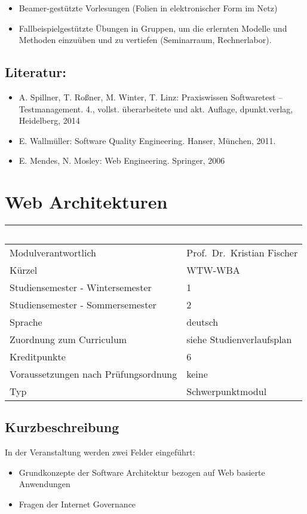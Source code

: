 \begin{itemize}
\item
  Beamer-gestützte Vorlesungen (Folien in elektronischer Form im Netz)
\item
  Fallbeispielgestützte Übungen in Gruppen, um die erlernten Modelle und
  Methoden einzuüben und zu vertiefen (Seminarraum, Rechnerlabor).
\end{itemize}

\section*{Literatur:}\label{literatur-24}

\begin{itemize}
\item
  A. Spillner, T. Roßner, M. Winter, T. Linz: Praxiswissen Softwaretest
  -- Testmanagement. 4., vollst. überarbeitete und akt. Auflage,
  dpunkt.verlag, Heidelberg, 2014
\item
  E. Wallmüller: Software Quality Engineering. Hanser, München, 2011.
\item
  E. Mendes, N. Mosley: Web Engineering. Springer, 2006
\end{itemize}

\chapter{Web Architekturen}\label{web-architekturen}

\begin{longtable}[]{@{}ll@{}}
\toprule
~ & ~\tabularnewline
\midrule
\endhead
Modulverantwortlich & Prof.~Dr.~Kristian Fischer\tabularnewline
Kürzel & WTW-WBA\tabularnewline
Studiensemester - Wintersemester & 1\tabularnewline
Studiensemester - Sommersemester & 2\tabularnewline
Sprache & deutsch\tabularnewline
Zuordnung zum Curriculum & siehe Studienverlaufsplan\tabularnewline
Kreditpunkte & 6\tabularnewline
Voraussetzungen nach Prüfungsordnung & keine\tabularnewline
Typ & Schwerpunktmodul\tabularnewline
\bottomrule
\end{longtable}

\section*{Kurzbeschreibung}\label{kurzbeschreibung-18}

In der Veranstaltung werden zwei Felder eingeführt:

\begin{itemize}
\item
  Grundkonzepte der Software Architektur bezogen auf Web basierte
  Anwendungen
\item
  Fragen der Internet Governance
\end{itemize}

